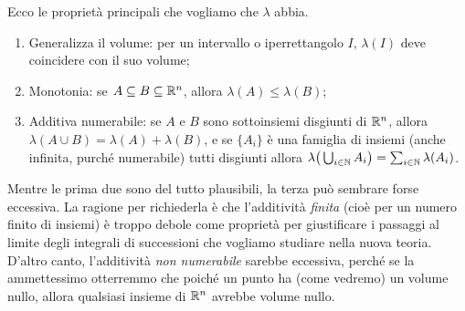 Ecco le proprietà principali che vogliamo che $\lambda$ abbia.
\begin{enumerate}
	\item Generalizza il volume: per un intervallo o iperrettangolo $I$, $\lambda(I)$ deve coincidere con il suo volume;
	\item Monotonia: se $A\subseteq B\subseteq\mathbb{R}^n$, allora $\lambda(A)\leq\lambda(B)$;
	\item Additiva numerabile: se $A$ e $B$ sono sottoinsiemi disgiunti di $\mathbb{R}^n$, allora $\lambda(A\cup B)=\lambda(A)+\lambda(B)$, e se $\{A_i\}$ è una famiglia di insiemi (anche infinita, purch\'e numerabile) tutti disgiunti allora $\lambda\big(\bigcup_{i\in\mathbb{N}}A_i\big)=\sum_{i\in\mathbb{N}}\lambda(A_i)$.
\end{enumerate}
Mentre le prima due sono del tutto plausibili, la terza può sembrare forse eccessiva.
La ragione per richiederla è che l'additività \emph{finita} (cioè per un numero finito di insiemi) è troppo debole come proprietà per giustificare i passaggi al limite degli integrali di successioni che vogliamo studiare nella nuova teoria.
D'altro canto, l'additività \emph{non numerabile} sarebbe eccessiva, perch\'e se la ammettessimo otterremmo che poich\'e un punto ha (come vedremo) un volume nullo, allora qualsiasi insieme di $\mathbb{R}^n$ avrebbe volume nullo.


